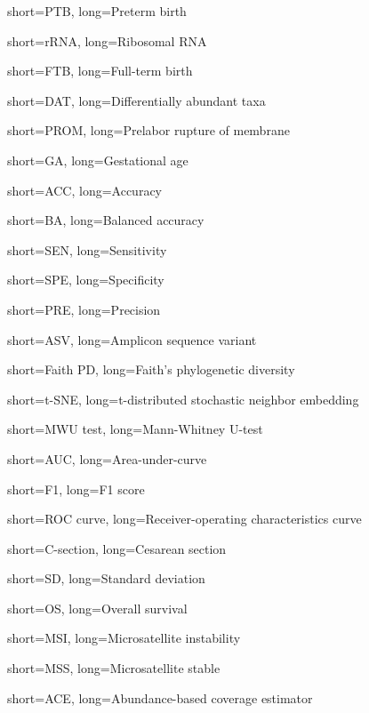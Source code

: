 {
    short=PTB,
    long=Preterm birth
}

{
    short=rRNA,
    long=Ribosomal RNA
}

{
    short=FTB,
    long=Full-term birth
}

{
    short=DAT,
    long=Differentially abundant taxa
}

{
    short=PROM,
    long=Prelabor rupture of membrane
}

{
    short=GA,
    long=Gestational age
}

{
    short=ACC,
    long=Accuracy
}

{
    short=BA,
    long=Balanced accuracy
}

{
    short=SEN,
    long=Sensitivity
}

{
    short=SPE,
    long=Specificity
}

{
    short=PRE,
    long=Precision
}

{
    short=ASV,
    long=Amplicon sequence variant
}

{
    short=Faith PD,
    long=Faith's phylogenetic diversity
}

{
    short=t-SNE,
    long=t-distributed stochastic neighbor embedding
}

{
    short=MWU test,
    long=Mann-Whitney U-test
}

{
    short=AUC,
    long=Area-under-curve 
}

{
    short=F1,
    long=F1 score
}

{
    short=ROC curve,
    long=Receiver-operating characteristics curve
}

{
    short=C-section,
    long=Cesarean section
}

{
    short=SD,
    long=Standard deviation
}

{
    short=OS,
    long=Overall survival
}

{
    short=MSI,
    long=Microsatellite instability
}

{
    short=MSS,
    long=Microsatellite stable
}

{
    short=ACE,
    long=Abundance-based coverage estimator
}

